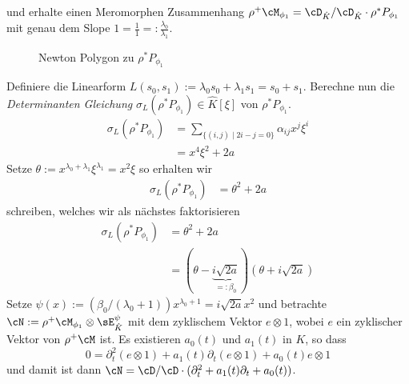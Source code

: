 \fi
und erhalte einen Meromorphen Zusammenhang $\rho^+\cM_{\phi_1}=\cD_{\hat
K}/\cD_{\hat K}\cdot\rho^*P_{\phi_1}$ mit genau dem Slope
$1=\frac{1}{1}=:\frac{\lambda_0}{\lambda_1}$.
\begin{figure}[H]
\caption{Newton Polygon zu $\rho^*P_{\phi_1}$}
\begin{center}
\end{center}
\end{figure}
Definiere die Linearform $L(s_0,s_1):=\lambda_0s_0+\lambda_1s_1=s_0+s_1$.
Berechne nun die \emph{Determinanten Gleichung} $\sigma_L(\rho^*P_{\phi_1})\in
\hat K[\xi]$ von $\rho^*P_{\phi_1}$.
\begin{align*}
\sigma_L(\rho^*P_{\phi_1})
  &= \sum_{\{(i,j)\mid 2i-j=0\}}\alpha_{ij}x^{j}\xi^i\\
  &= x^4\xi^2 + 2a
\end{align*}
Setze $\theta:=x^{\lambda_0+\lambda_1}\xi^{\lambda_1}=x^2\xi$ so erhalten wir
\begin{align*}
\sigma_L(\rho^*P_{\phi_1}) &= \theta^2 + 2a
\end{align*}
schreiben, welches wir als nächstes faktorisieren
\begin{align*}
\sigma_L(\rho^*P_{\phi_1}) &= \theta^2+2a\\
  &=(\theta-\underset{=:\beta_0}{\underbrace{i\sqrt{2a}}})
    (\theta+i\sqrt{2a})
\end{align*}
Setze $\psi(x):=(\beta_0/(\lambda_0+1))x^{\lambda_0+1}=i\sqrt{2a}x^2$ und
betrachte $\cN:=\rho^+\cM_{\phi_1}\otimes\sE_{\hat K}^\psi$ mit dem zyklischem
Vektor $e\otimes 1$, wobei $e$ ein zyklischer Vektor von $\rho^+\cM$ ist.
Es existieren $a_0(t)$ und $a_1(t)$ in $K$, so dass
\[
0=\partial_t^2 (e\otimes 1) + a_1(t)\partial_t (e\otimes 1) + a_0(t) e\otimes 1
\]
und damit ist dann $\cN=\cD/\cD\cdot(\partial_t^2+a_1(t)\partial_t+a_0(t))$.
\begin{comment}
\begin{align*}
0 &= (\frac{1}{2}t^{4}\partial_t^2-\frac{1}{2}t^{3}\partial_t+a)e\\
0 &= (\partial_t^2-t^{-1}\partial_t+2t^{-4}a)e\\
\partial_t^2e &= (t^{-1}\partial_t-2t^{-4}a)e\\
\end{align*}
\end{comment}

